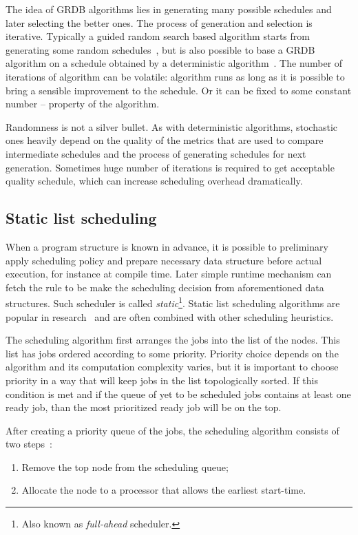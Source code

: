 The idea of GRDB algorithms lies in generating many possible schedules
and later selecting the better ones. The process of generation and
selection is iterative. Typically a guided random search based
algorithm starts from generating some random
schedules~\cite{grajcar1999genetic, aggarwal2005, wang2009,
  kolodziej2013}, but is also possible to base a GRDB algorithm on a
schedule obtained by a deterministic
algorithm~\cite{braun2001comparison}. The number of iterations of
algorithm can be volatile: algorithm runs as long as it is possible to
bring a sensible improvement to the schedule. Or it can be fixed to
some constant number -- property of the algorithm.

Randomness is not a silver bullet. As with deterministic algorithms,
stochastic ones heavily depend on the quality of the metrics that are
used to compare intermediate schedules and the process of generating
schedules for next generation. Sometimes huge number of iterations is
required to get acceptable quality schedule, which can increase
scheduling overhead dramatically.

\subsection{Static list scheduling}
\label{sec:static}

When a program structure is known in advance, it is possible to
preliminary apply scheduling policy and prepare necessary data
structure before actual execution, for instance at compile time. Later
simple runtime mechanism can fetch the rule to be make the scheduling
decision from aforementioned data structures. Such scheduler is called
\emph{static}\footnote{Also known as \emph{full-ahead}
  scheduler.}. Static list scheduling algorithms are popular in
research~\cite{adam1974, kwok1999static, wu1997parallelization} and
are often combined with other scheduling heuristics.

The scheduling algorithm first arranges the jobs into the list of the
nodes. This list has jobs ordered according to some priority. Priority
choice depends on the algorithm and its computation complexity varies,
but it is important to choose priority in a way that will keep jobs in
the list topologically sorted. If this condition is met and if the
queue of yet to be scheduled jobs contains at least one ready job,
than the most prioritized ready job will be on the top.

After creating a priority queue of the jobs, the scheduling algorithm
consists of two steps~\cite{kwok1999benchmarking}:
\begin{enumerate}
\item Remove the top node from the scheduling queue;
\item Allocate the node to a processor that allows the earliest start-time.
\end{enumerate}

